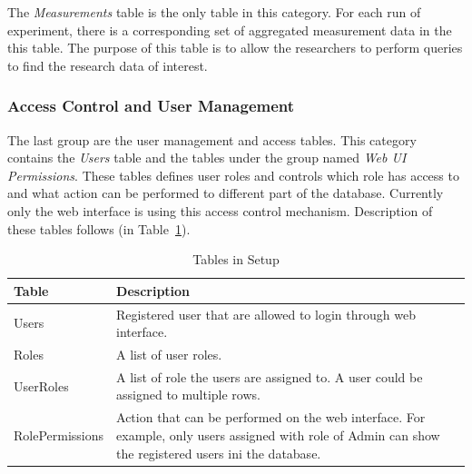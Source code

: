 The \emph{Measurements} table is the only table in this category. For each run of experiment, there is a corresponding set of aggregated measurement data in the  this table. The purpose of this table is to allow the researchers to perform queries to find the research data of interest.


\subsubsection{Access Control and User Management}

The last group are the user management and access tables. This category contains the \emph{Users} table and the tables under the group named \emph{Web UI Permissions}. These tables defines user roles and controls which role has access to and what action can be performed to different part of the database. Currently only the web interface is using this access control mechanism. Description of these tables follows (in Table~\ref{tb_tables_in_access}).

\begin{table}[h!]
\centering
\caption{Tables in Setup}\label{tb_tables_in_access}
\begin{tabular}{l p{12cm}} \hline
{\bf Table}         & {\bf Description}\\ \hline
Users           & Registered user that are allowed to login through web interface.\\ \hline
Roles           & A list of user roles.\\ \hline
UserRoles       & A list of role the users are assigned to. A user could be assigned to multiple rows. \\ \hline
RolePermissions & Action that can be performed on the web interface. For example, only users assigned with role of Admin can show the registered users ini the database.\\ \hline
\end{tabular}
\end{table}






